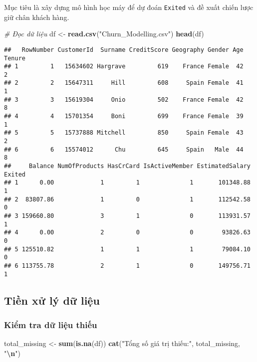 \documentclass[
]{article}
\newenvironment{Shaded}{\begin{snugshade}}{\end{snugshade}}
\newcommand{\CommentTok}[1]{\textcolor[rgb]{0.56,0.35,0.01}{\textit{#1}}}
\newcommand{\FunctionTok}[1]{\textcolor[rgb]{0.13,0.29,0.53}{\textbf{#1}}}
\newcommand{\NormalTok}[1]{#1}
\newcommand{\OtherTok}[1]{\textcolor[rgb]{0.56,0.35,0.01}{#1}}
\newcommand{\SpecialCharTok}[1]{\textcolor[rgb]{0.81,0.36,0.00}{\textbf{#1}}}
\newcommand{\StringTok}[1]{\textcolor[rgb]{0.31,0.60,0.02}{#1}}
\begin{document}
Mục tiêu là xây dựng mô hình học máy để dự đoán \texttt{Exited} và đề
xuất chiến lược giữ chân khách hàng.

\begin{Shaded}
\begin{Highlighting}[]
\CommentTok{\# Đọc dữ liệu}
\NormalTok{df }\OtherTok{\textless{}{-}} \FunctionTok{read.csv}\NormalTok{(}\StringTok{"Churn\_Modelling.csv"}\NormalTok{)}
\FunctionTok{head}\NormalTok{(df)}
\end{Highlighting}
\end{Shaded}

\begin{verbatim}
##   RowNumber CustomerId  Surname CreditScore Geography Gender Age Tenure
## 1         1   15634602 Hargrave         619    France Female  42      2
## 2         2   15647311     Hill         608     Spain Female  41      1
## 3         3   15619304     Onio         502    France Female  42      8
## 4         4   15701354     Boni         699    France Female  39      1
## 5         5   15737888 Mitchell         850     Spain Female  43      2
## 6         6   15574012      Chu         645     Spain   Male  44      8
##     Balance NumOfProducts HasCrCard IsActiveMember EstimatedSalary Exited
## 1      0.00             1         1              1       101348.88      1
## 2  83807.86             1         0              1       112542.58      0
## 3 159660.80             3         1              0       113931.57      1
## 4      0.00             2         0              0        93826.63      0
## 5 125510.82             1         1              1        79084.10      0
## 6 113755.78             2         1              0       149756.71      1
\end{verbatim}

\subsection{Tiền xử lý dữ liệu}\label{sec-preprocessing}

\subsubsection{Kiểm tra dữ liệu thiếu}\label{sec-missing}

\begin{Shaded}
\begin{Highlighting}[]
\NormalTok{total\_missing }\OtherTok{\textless{}{-}} \FunctionTok{sum}\NormalTok{(}\FunctionTok{is.na}\NormalTok{(df))}
\FunctionTok{cat}\NormalTok{(}\StringTok{"Tổng số giá trị thiếu:"}\NormalTok{, total\_missing, }\StringTok{"}\SpecialCharTok{\textbackslash{}n}\StringTok{"}\NormalTok{)}
\end{Highlighting}
\end{Shaded}
\end{document}
